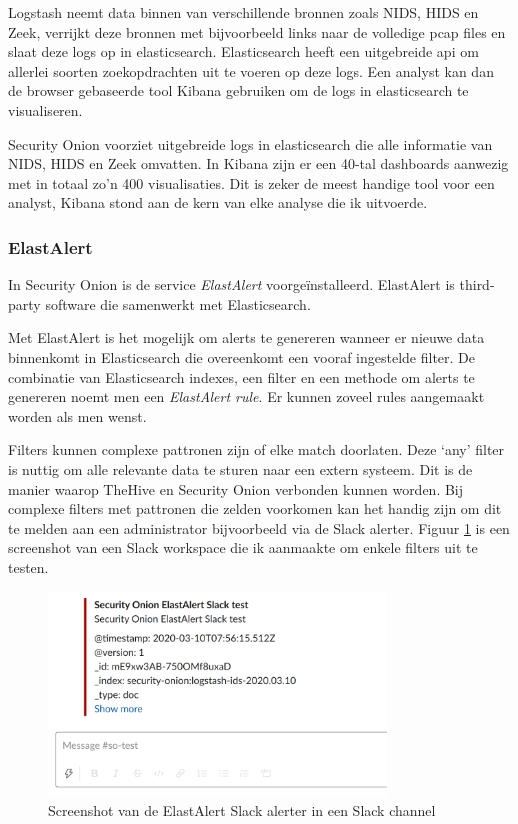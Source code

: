 \documentclass[a4paper,12pt]{report}
\begin{document}
Logstash neemt data binnen van verschillende bronnen zoals NIDS, HIDS en Zeek, verrijkt deze bronnen met bijvoorbeeld links naar de volledige pcap files en slaat deze logs op in elasticsearch.
Elasticsearch heeft een uitgebreide api om allerlei soorten zoekopdrachten uit te voeren op deze logs.
Een analyst kan dan de browser gebaseerde tool Kibana gebruiken om de logs in elasticsearch te visualiseren.
\autocite{elastic:what-is-elk}

Security Onion voorziet uitgebreide logs in elasticsearch die alle informatie van NIDS, HIDS en Zeek omvatten.
In Kibana zijn er een 40-tal dashboards aanwezig met in totaal zo'n 400 visualisaties.
Dit is zeker de meest handige tool voor een analyst, Kibana stond aan de kern van elke analyse die ik uitvoerde.

\subsubsection{ElastAlert}
In Security Onion is de service \emph{ElastAlert} voorgeïnstalleerd.
ElastAlert is third-party software die samenwerkt met Elasticsearch.

Met ElastAlert is het mogelijk om alerts te genereren wanneer er nieuwe data binnenkomt in Elasticsearch die overeenkomt een vooraf ingestelde filter.
De combinatie van Elasticsearch indexes, een filter en een methode om alerts te genereren noemt men een \emph{ElastAlert rule}.
Er kunnen zoveel rules aangemaakt worden als men wenst.

Filters kunnen complexe pattronen zijn of elke match doorlaten.
Deze `any' filter is nuttig om alle relevante data te sturen naar een extern systeem.
Dit is de manier waarop TheHive en Security Onion verbonden kunnen worden.
Bij complexe filters met pattronen die zelden voorkomen kan het handig zijn om dit te melden aan een administrator bijvoorbeeld via de Slack alerter.
Figuur \ref{fig:elastalert-slack} is een screenshot van een Slack workspace die ik aanmaakte om enkele filters uit te testen.

\begin{figure}[H]
  \centering
  \includegraphics[width=0.8\textwidth]{elastalert-slack}
  \caption{Screenshot van de ElastAlert Slack alerter in een Slack channel}
  \label{fig:elastalert-slack}
\end{figure}
\end{document}
